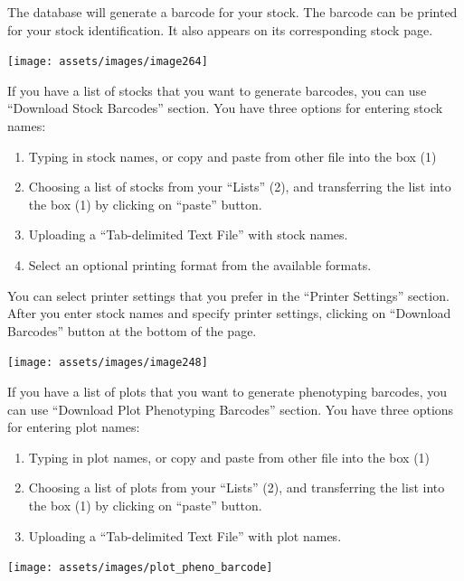 \documentclass[
  12pt,
]{book}
\begin{document}
The database will generate a barcode for your stock. The barcode can be printed for your stock identification. It also appears on its corresponding stock page.

\begin{center}\texttt{[image: assets/images/image264]} \end{center}

If you have a list of stocks that you want to generate barcodes, you can use ``Download Stock Barcodes'' section. You have three options for entering stock names:

\begin{enumerate}
\def\labelenumi{\arabic{enumi}.}
\item
  Typing in stock names, or copy and paste from other file into the box (1)
\item
  Choosing a list of stocks from your ``Lists'' (2), and transferring the list into the box (1) by clicking on ``paste'' button.
\item
  Uploading a ``Tab-delimited Text File'' with stock names.
\item
  Select an optional printing format from the available formats.
\end{enumerate}

You can select printer settings that you prefer in the ``Printer Settings'' section. After you enter stock names and specify printer settings, clicking on ``Download Barcodes'' button at the bottom of the page.

\begin{center}\texttt{[image: assets/images/image248]} \end{center}

If you have a list of plots that you want to generate phenotyping barcodes, you can use ``Download Plot Phenotyping Barcodes'' section. You have three options for entering plot names:

\begin{enumerate}
\def\labelenumi{\arabic{enumi}.}
\item
  Typing in plot names, or copy and paste from other file into the box (1)
\item
  Choosing a list of plots from your ``Lists'' (2), and transferring the list into the box (1) by clicking on ``paste'' button.
\item
  Uploading a ``Tab-delimited Text File'' with plot names.
\end{enumerate}

\begin{center}\texttt{[image: assets/images/plot\_pheno\_barcode]} \end{center}
\end{document}
